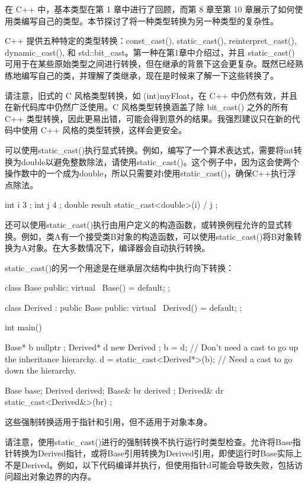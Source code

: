 
在 C++ 中，基本类型在第 1 章中进行了回顾，而第 8 章至第 10 章展示了如何使用类编写自己的类型。本节探讨了将一种类型转换为另一种类型的复杂性。

C++ 提供五种特定的类型转换：const\_cast(), static\_cast(), reinterpret\_cast(), dynamic\_cast(), 和 std::bit\_cast。第一种在第1章中介绍过，并且 static\_cast() 可用于在某些原始类型之间进行转换，但在继承的背景下这会更复杂。既然已经熟练地编写自己的类，并理解了类继承，现在是时候来了解一下这些转换了。

请注意，旧式的 C 风格类型转换，如 (int)myFloat，在 C++ 中仍然有效，并且在新代码库中仍然广泛使用。C 风格类型转换涵盖了除 bit\_cast() 之外的所有 C++ 类型转换，因此更易出错，可能会得到意外的结果。我强烈建议只在新的代码中使用 C++ 风格的类型转换，这样会更安全。


可以使用static\_cast()执行显式转换。例如，编写了一个算术表达式，需要将int转换为double以避免整数除法，请使用static\_cast()。这个例子中，因为这会使两个操作数中的一个成为double，所以只需要对i使用static\_cast()，确保C++执行浮点除法。

\begin{cpp}
int i { 3 };
int j { 4 };
double result { static_cast<double>(i) / j };
\end{cpp}

还可以使用static\_cast()执行由用户定义的构造函数，或转换例程允许的显式转换。例如，类A有一个接受类B对象的构造函数，可以使用static\_cast()将B对象转换为A对象。在大多数情况下，编译器会自动执行转换。

static\_cast()的另一个用途是在继承层次结构中执行向下转换：

\begin{cpp}
class Base
{
    public:
        virtual ~Base() = default;
};

class Derived : public Base
{
    public:
        virtual ~Derived() = default;
};

int main()
{
    Base* b { nullptr };
    Derived* d { new Derived {} };
    b = d; // Don't need a cast to go up the inheritance hierarchy.
    d = static_cast<Derived*>(b); // Need a cast to go down the hierarchy.

    Base base;
    Derived derived;
    Base& br { derived };
    Derived& dr { static_cast<Derived&>(br) };
}
\end{cpp}

这些强制转换适用于指针和引用，但不适用于对象本身。

请注意，使用static\_cast()进行的强制转换不执行运行时类型检查。允许将Base指针转换为Derived指针，或将Base引用转换为Derived引用，即使运行时Base实际上不是Derived。例如，以下代码编译并执行，但使用指针d可能会导致失败，包括访问超出对象边界的内存。

